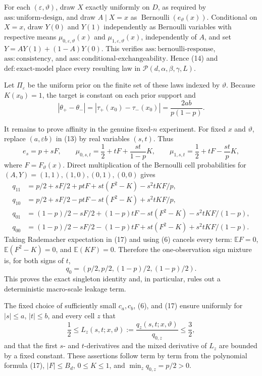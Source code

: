 For each \((\varepsilon,\vartheta)\), draw \(X\) exactly uniformly on \(D\), as required by \(\mathrm{ass:uniform\mbox{-}design}\), and draw \(A\mid X=x\) as \(\operatorname{Bernoulli}(e_\vartheta(x))\).  Conditional on \(X=x\), draw \(Y(0)\) and \(Y(1)\) independently as Bernoulli variables with respective means \(\mu_{0,\varepsilon,\vartheta}(x)\) and \(\mu_{1,\varepsilon,\vartheta}(x)\), independently of \(A\), and set \(Y=AY(1)+(1-A)Y(0)\).  This verifies \(\mathrm{ass:bernoulli\mbox{-}response}\), \(\mathrm{ass:consistency}\), and \(\mathrm{ass:conditional\mbox{-}exchangeability}\).  Hence (14) and \(\mathrm{def:exact\mbox{-}model}\) place every resulting law in \(\mathcal P(d,\alpha,\beta,\gamma,L)\).

Let \(\Pi_\varepsilon\) be the uniform prior on the finite set of these laws indexed by \(\vartheta\).  Because \(K(x_0)=1\), the target is constant on each prior support and
\[
 |\theta_+-\theta_-|
 =|\tau_+(x_0)-\tau_-(x_0)|
 =\frac{2ab}{p(1-p)}.                                           \tag{15}
\]

It remains to prove affinity in the genuine fixed-\(n\) experiment.  For fixed \(x\) and \(\vartheta\), replace \((a,\varepsilon b)\) in (13) by real variables \((s,t)\).  Thus
\[
 e_s=p+sF,
 \qquad \mu_{0,s,t}=\frac12+tF+\frac{st}{1-p}K,
 \qquad \mu_{1,s,t}=\frac12+tF-\frac{st}{p}K,                  \tag{16}
\]
where \(F=F_\vartheta(x)\).  Direct multiplication of the Bernoulli cell probabilities for \((A,Y)=(1,1),(1,0),(0,1),(0,0)\) gives
\[
\begin{aligned}
 q_{11}&=p/2+sF/2+ptF+st(F^2-K)-s^2tKF/p,\\
 q_{10}&=p/2+sF/2-ptF-st(F^2-K)+s^2tKF/p,\\
 q_{01}&=(1-p)/2-sF/2+(1-p)tF-st(F^2-K)-s^2tKF/(1-p),\\
 q_{00}&=(1-p)/2-sF/2-(1-p)tF+st(F^2-K)+s^2tKF/(1-p).
                                                                    \tag{17}
\end{aligned}
\]
Taking Rademacher expectation in (17) and using (6) cancels every term: \(\mathbb E F=0\), \(\mathbb E(F^2-K)=0\), and \(\mathbb E(KF)=0\).  Therefore the one-observation sign mixture is, for both signs of \(t\),
\[
 q_0=(p/2,p/2,(1-p)/2,(1-p)/2).                                \tag{18}
\]
This proves the exact singleton identity and, in particular, rules out a deterministic macro-scale leakage term.

The fixed choice of sufficiently small \(c_a,c_b\), (6), and (17) ensure uniformly for \(|s|\le a\), \(|t|\le b\), and every cell \(z\) that
\[
 \frac12\le L_z(s,t;x,\vartheta):=\frac{q_z(s,t;x,\vartheta)}{q_{0,z}}
 \le\frac32,                                                     \tag{19}
\]
and that the first \(s\)- and \(t\)-derivatives and the mixed derivative of \(L_z\) are bounded by a fixed constant.  These assertions follow term by term from the polynomial formula (17), \(|F|\le B_d\), \(0\le K\le1\), and \(\min_zq_{0,z}=p/2>0\).

